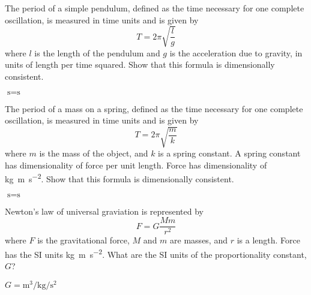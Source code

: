

\begin{question}[ID=DA01,topic=measurement,difficulty=easy]
    The period of a simple pendulum, defined as the time necessary for one complete oscillation,
        is measured in time units and is given by
    \begin{equation*}
        T = 2\pi \sqrt{\frac{l}{g}}
    \end{equation*}
    where $l$ is the length of the pendulum and $g$ is the acceleration due to gravity,
        in units of length per time squared.
    Show that this formula is dimensionally consistent.
\end{question}
\begin{solution}
    $\si{\second} = \si{\second}$
\end{solution}

\begin{question}[ID=DA02,topic=measurement,difficulty=easy]
    The period of a mass on a spring, defined as the time necessary for one complete oscillation,
        is measured in time units and is given by
    \begin{equation*}
        T = 2\pi \sqrt{\frac{m}{k}}
    \end{equation*}
    where $m$ is the mass of the object,
    and $k$ is a spring constant.
    A spring constant has dimensionality of force per unit length.
    Force has dimensionality of \si{\kilo\gram\meter\per\second\squared}.
    Show that this formula is dimensionally consistent.
\end{question}
\begin{solution}
    $\si{\second} = \si{\second}$
\end{solution}

\begin{question}[ID=DA03,topic=measurement,difficulty=easy]
    Newton's law of universal graviation is represented by
    \begin{equation*}
        F = G \frac{Mm}{r^2}
    \end{equation*}
    where $F$ is the gravitational force, $M$ and $m$ are masses, and $r$ is a length.
    Force has the SI units \si{\kilo\gram\meter\per\second\squared}.
    What are the SI units of the proportionality constant, $G$?
\end{question}
\begin{solution}
    $G = \si{\meter\cubed\per\kilo\gram\per\second\squared}$
\end{solution}

